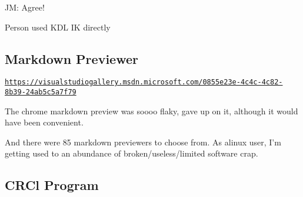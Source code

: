 J\-M\-: Agree!

Person used K\-D\-L I\-K directly

\subsection*{Markdown Previewer }

\href{https://visualstudiogallery.msdn.microsoft.com/0855e23e-4c4c-4c82-8b39-24ab5c5a7f79}{\tt https\-://visualstudiogallery.\-msdn.\-microsoft.\-com/0855e23e-\/4c4c-\/4c82-\/8b39-\/24ab5c5a7f79}

The chrome markdown preview was soooo flaky, gave up on it, although it would have been convenient.

And there were 85 markdown previewers to choose from. As alinux user, I'm getting used to an abundance of broken/useless/limited software crap.

\subsection*{C\-R\-Cl Program }


